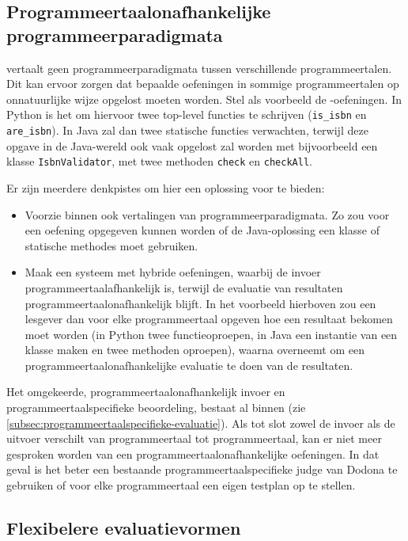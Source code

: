 \subsection{Programmeertaalonafhankelijke programmeerparadigmata}\label{subsec:programmeertaalonafhankelijke-programmeerparadigma}

\tested{} vertaalt geen programmeerparadigmata tussen verschillende programmeertalen.
Dit kan ervoor zorgen dat bepaalde oefeningen in sommige programmeertalen op onnatuurlijke wijze opgelost moeten worden.
Stel als voorbeeld de -oefeningen.
In Python is het  om hiervoor twee top-level functies te schrijven (\texttt{is\_isbn} en \texttt{are\_isbn}).
In Java zal \tested{} dan twee statische functies verwachten, terwijl deze opgave in de Java-wereld ook vaak opgelost zal worden met bijvoorbeeld een klasse \texttt{IsbnValidator}, met twee methoden \texttt{check} en \texttt{checkAll}.

Er zijn meerdere denkpistes om hier een oplossing voor te bieden:

\begin{itemize}
    \item Voorzie binnen \tested{} ook vertalingen van programmeerparadigmata.
    Zo zou voor een oefening opgegeven kunnen worden of de Java-oplossing een klasse of statische methodes moet gebruiken.
    \item Maak een systeem met hybride oefeningen, waarbij de invoer programmeertaalafhankelijk is, terwijl de evaluatie van resultaten programmeertaalonafhankelijk blijft.
    In het voorbeeld hierboven zou een lesgever dan voor elke programmeertaal opgeven hoe een resultaat bekomen moet worden (in Python twee functieoproepen, in Java een instantie van een klasse maken en twee methoden oproepen), waarna \tested{} overneemt om een programmeertaalonafhankelijke evaluatie te doen van de resultaten.
\end{itemize}

Het omgekeerde, programmeertaalonafhankelijk invoer en programmeertaalspecifieke beoordeling, bestaat al binnen \tested{} (zie \cref{subsec:programmeertaalspecifieke-evaluatie}).
Als tot slot zowel de invoer als de uitvoer verschilt van programmeertaal tot programmeertaal, kan er niet meer gesproken worden van een programmeertaalonafhankelijke oefeningen.
In dat geval is het beter een bestaande programmeertaalspecifieke judge van Dodona te gebruiken of voor elke programmeertaal een eigen testplan op te stellen.

\subsection{Flexibelere evaluatievormen}\label{subsec:combinaties-van-evaluatiemanieren}

